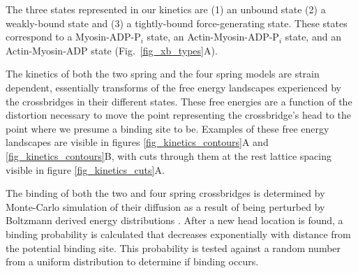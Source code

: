 \documentclass[]{article}
\begin{document}
The three states represented in our kinetics are (1) an unbound state (2) a weakly-bound state and (3) a tightly-bound force-generating state.
These states correspond to a Myosin-ADP-P$_i$ state, an Actin-Myosin-ADP-P$_i$ state, and an Actin-Myosin-ADP state (Fig.~\ref{fig_xb_types}A).

The kinetics of both the two spring and the four spring models are strain dependent, essentially transforms of the free energy landscapes experienced by the crossbridges in their different states.
These free energies are a function of the distortion necessary to move the point representing the crossbridge's head to the point where we presume a binding site to be.
Examples of these free energy landscapes are visible in figures \ref{fig_kinetics_contours}A and \ref{fig_kinetics_contours}B, with cuts through them at the rest lattice spacing visible in figure \ref{fig_kinetics_cuts}A.

The binding of both the two and four spring crossbridges is determined by Monte-Carlo simulation of their diffusion as a result of being perturbed by Boltzmann derived energy distributions \citep{DillBook}. 
After a new head location is found, a binding probability is calculated that decreases exponentially with distance from the potential binding site. 
This probability is tested against a random number from a uniform distribution to determine if binding occurs.
\end{document}
